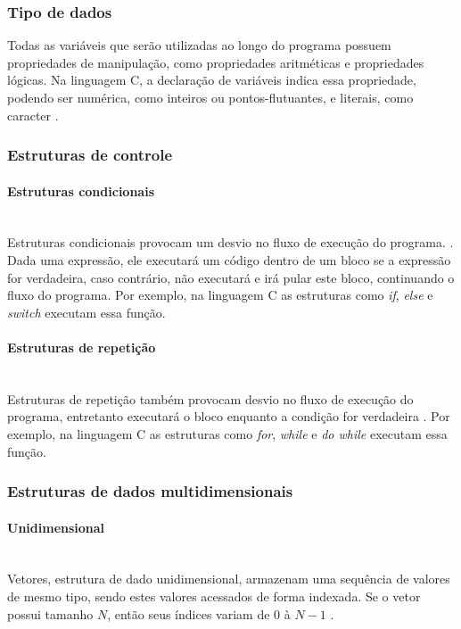 \subsubsection{Tipo de dados}
Todas as variáveis que serão utilizadas ao longo do programa possuem propriedades de manipulação, como propriedades aritméticas e propriedades lógicas. Na linguagem C, a declaração de variáveis indica essa propriedade, podendo ser numérica, como inteiros ou pontos-flutuantes, e literais, como caracter \cite{cprogramming}.

\subsubsection{Estruturas de controle}

\paragraph{Estruturas condicionais} \mbox{}\\
Estruturas condicionais provocam um desvio no fluxo de execução do programa. \cite{algoritmos}. Dada uma expressão, ele executará um código dentro de um bloco se a expressão for verdadeira, caso contrário, não executará e irá pular este bloco, continuando o fluxo do programa. Por exemplo, na linguagem C as estruturas como \emph{if}, \emph{else} e \emph{switch} executam essa função.

\paragraph{Estruturas de repetição} \mbox{}\\
Estruturas de repetição também provocam desvio no fluxo de execução do programa, entretanto executará o bloco enquanto a condição for verdadeira \cite{algoritmos}. Por exemplo, na linguagem C as estruturas como \emph{for}, \emph{while} e \emph{do while} executam essa função.

\subsubsection{Estruturas de dados multidimensionais}

\paragraph{Unidimensional} \mbox{}\\
Vetores, estrutura de dado unidimensional, armazenam uma sequência de valores de mesmo tipo, sendo estes valores acessados de forma indexada. Se o vetor possui tamanho $N$, então seus índices variam de $0$ à $N-1$  \cite{algoritmos}. 

